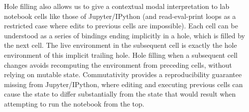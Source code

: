 
Hole filling also allows us to give a contextual modal interpretation
to lab notebook cells  like those of
Jupyter/IPython \cite{PER-GRA:2007} (and read-eval-print loops as a restricted case
where edits to previous cells are impossible).
%
Each cell can be understood as a series of 
bindings ending implicitly in a hole, which is filled by the next cell.
The live environment in the subsequent cell is exactly the hole environment of this implicit trailing hole.
%
Hole filling when a subsequent cell changes avoids recomputing the
environment from preceding cells, without relying on mutable state. Commutativity provides a reproducibility guarantee
missing from Jupyter/IPython, where editing and executing previous cells can cause the state to differ substantially from the state that would result when attempting to run the notebook from the top.

\begin{comment}

\begin{theorem}[Maximum Informativity]
If the expansion produces $t1$, and there exists another possible type choice
$t2$, then $t1 \sim t2$ and $t1 JOIN t2 = t1$
\end{theorem}\footnote{idea is that special casing the holes in EANEHole gives you ``the
most descriptive hole types'' for some sense of what that means -- they'd
all just be hole other wise. from Matt:
\begin{quote}
It sounds like we need a something akin to an abstract domain (a lattice),
where hole has the least information, and a fully-defined type (without
holes) has the most information.  You can imagine that this lattice really
expands the existing definition we have of type consistency, which is
merely the predicate that says whether two types are comparable
(“join-able”) in this lattice.  lattice join is the operation that goes
through the structure of two (consistent) types, and chooses the structure
that is more defined (i.e., non-hole, if given the choice between hole and
non-hole).

The rule choosenonhole below is the expansion of this consistency rule that
we already have (hole consistent with everything)
\end{quote}}

\begin{verbatim}
t not hole
-------------------- :: choose-non-hole
hole JOIN t  = t
\end{verbatim}
\begin{verbatim}
------------ :: hole-consistent-with-everything
hole ~ t
\end{verbatim}

\end{comment}
